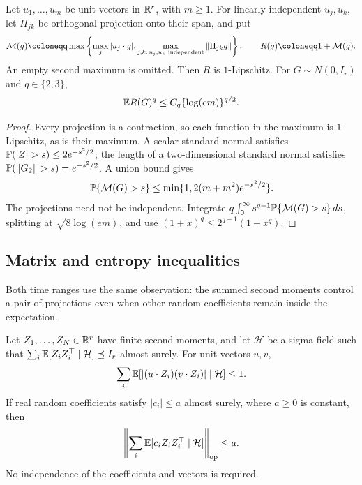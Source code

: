 \begin{fact}
\label{tb:projection-moments}
Let \(u_1,\ldots,u_m\) be unit vectors in \(\mathbb R^r\), with \(m\ge1\).
For linearly independent \(u_j,u_k\), let \(\Pi_{jk}\) be orthogonal
projection onto their span, and put
\[
 \mathcal M(g)\coloneqq \max\left\{\max_j|u_j\cdot g|,
   \max_{j,k:\,u_j,u_k\text{ independent}}\norm{\Pi_{jk}g}\right\},
 \qquad R(g)\coloneqq 1+\mathcal M(g).
\]
An empty second maximum is omitted. Then \(R\) is \(1\)-Lipschitz.
For \(G\sim N(0,I_r)\) and \(q\in\{2,3\}\),
\[
 \mathbb E R(G)^q\le C_q\{\log(em)\}^{q/2}.
\]
\end{fact}

\begin{proof}
Every projection is a contraction, so each function in the maximum
is \(1\)-Lipschitz, as is their maximum. A scalar standard normal
satisfies \(\Pp(|Z|>s)\le2e^{-s^2/2}\); the length of a
two-dimensional standard normal satisfies
\(\mathbb P(\left\lVert G_2\right\rVert>s)=e^{-s^2/2}\). A union bound gives
\[
 \mathbb P\{\mathcal M(G)>s\}\le\min\{1,2(m+m^2)e^{-s^2/2}\}.
\]
The projections need not be independent. Integrate
\(q\int_0^\infty s^{q-1}\mathbb P\{\mathcal M(G)>s\}\,ds\), splitting
at \(\sqrt{8\log(em)}\), and use
\((1+x)^q\le2^{q-1}(1+x^q)\).
\end{proof}


\subsection{Matrix and entropy inequalities}\label{tb:sec:matrix}

Both time ranges use the same observation: the summed second moments
control a pair of projections even when other random coefficients
remain inside the expectation.

\begin{fact}\label{tb:covariance}
Let \(Z_1,\ldots,Z_N\in\mathbb R^r\) have finite second moments, and let
\(\mathcal H\) be a sigma-field such that
\(\sum_i\mathbb E[Z_iZ_i^\top\mid\mathcal H]\preceq I_r\) almost surely.
For unit vectors \(u,v\),
\[
 \sum_i\mathbb E[|(u\cdot Z_i)(v\cdot Z_i)|\mid\mathcal H]\le1.
\]
If real random coefficients satisfy \(|c_i|\le a\) almost surely,
where \(a\ge0\) is constant, then
\[
 \left\|\sum_i\mathbb E[c_iZ_iZ_i^\top\mid\mathcal H]\right\|_{\mathrm{op}}\le a.
\]
No independence of the coefficients and vectors is required.
\end{fact}

